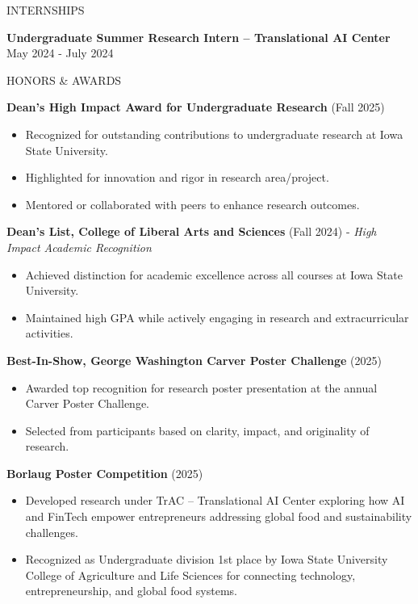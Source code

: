 \documentclass{resume} %
\begin{document}

\begin{rSection}{INTERNSHIPS}

\textbf{Undergraduate Summer Research Intern – Translational AI Center} \hfill May 2024 - July 2024

\end{rSection}

\begin{rSection}{HONORS \& AWARDS}

\textbf{Dean's High Impact Award for Undergraduate Research} (Fall 2025)
\begin{itemize}
    \item Recognized for outstanding contributions to undergraduate research at Iowa State University.
    \item Highlighted for innovation and rigor in research area/project.
    \item Mentored or collaborated with peers to enhance research outcomes.
\end{itemize}

\textbf{Dean's List, College of Liberal Arts and Sciences} (Fall 2024) - \textit{High Impact Academic Recognition}
\begin{itemize}
    \item Achieved distinction for academic excellence across all courses at Iowa State University.
    \item Maintained high GPA while actively engaging in research and extracurricular activities.
\end{itemize}

\textbf{Best-In-Show, George Washington Carver Poster Challenge} (2025)
\begin{itemize}
    \item Awarded top recognition for research poster presentation at the annual Carver Poster Challenge.
    \item Selected from participants based on clarity, impact, and originality of research.
\end{itemize}

\textbf{Borlaug Poster Competition} (2025)
\begin{itemize}
    \item Developed research under TrAC – Translational AI Center exploring how AI and FinTech empower entrepreneurs addressing global food and sustainability challenges.
    \item Recognized as Undergraduate division 1st place by Iowa State University College of Agriculture and Life Sciences for connecting technology, entrepreneurship, and global food systems.
\end{itemize}


\end{rSection}
\end{document}

